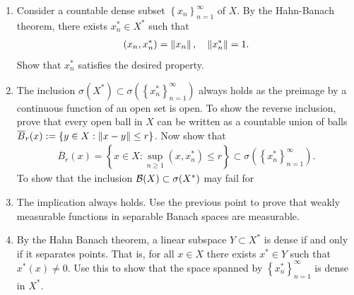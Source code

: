 \documentclass[
    a4paper,
    DIV=14,
    abstract=true,
    numbers=noenddot
]{scrartcl}
\begin{document}
\begin{hint}
	\begin{enumerate}
		\item Consider a countable dense subset $\left\{x_n\right\}_{n=1}^\infty$ of $X$. By the Hahn-Banach theorem, there exists $x_n^*\in X^*$ such that
		      \begin{align*}
			      (x_n,x_n^*)= \left\lVert x_n \right\rVert, \quad \left\lVert x_n^* \right\rVert=1.
		      \end{align*}
		      Show that $x_n^*$ satisfies the desired property.
		\item The inclusion $\sigma (X^*) \subset \sigma\left(\left\{x_n^*\right\}_{n=1}^ \infty\right)$ always holds as the preimage by a continuous function of an open set is open. To show the reverse inclusion, prove that every open ball in $X$ can be written as a countable union of balls $\overline{B}_r(x):= \left\{y \in X: \left\lVert x-y \right\rVert\leq r\right\}$. Now show that
		      \begin{align*}
			      \overline{B}_r(x)=\left\{x\in X: \sup_{n \geq1}(x,x_n^*) \leq r\right\} \subset \sigma\left(\left\{x_n^*\right\}_{n=1}^ \infty\right).
		      \end{align*}
		      To show that the inclusion $\mathcal{B}(X)\subset \sigma(X^*)$ may fail for
		\item The implication always holds. Use the previous point to prove that weakly measurable functions in separable Banach spaces are measurable.
		\item By the Hahn Banach theorem, a linear subspace $Y \subset X^*$ is dense if and only if it separates points. That is, for all $x\in X$ there exists $x^*\in Y$ such that $x^*(x)\neq 0$. Use this to show that the space spanned by $\left\{x_n^*\right\}_{n=1}^\infty$ is dense in $X^*$.
	\end{enumerate}
\end{hint}
\end{document}
